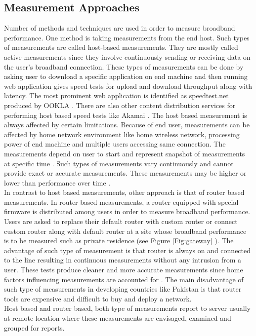 \documentclass{sig-alternate-10pt}
\begin{document}
\subsection {Measurement Approaches}
Number of methods and techniques are used in order to measure broadband performance. One method is taking measurements from the end host. Such types of measurements are called host-based measurements. They are mostly called active measurements since they involve continuously sending or receiving data on the user's broadband connection. These types of measurements can be done by asking user to download a specific application  \cite{08} on end machine and then running web application gives speed tests for upload and download throughput along with latency. The most prominent web application is identified as speedtest.net produced by OOKLA \cite{20}. There are also other content distribution services for performing host based speed tests like Akamai \cite{04}. The host based measurement is always affected by certain limitations. Because of end user, measurements can be affected by home network environment like home wireless network, processing power of end machine and multiple users accessing same connection. The measurements depend on user to start and represent snapshot of measurements at specific time \cite{09}. Such types of measurements vary continuously and cannot provide exact or accurate measurements. These measurements may be higher or lower than performance over time \cite{12}.\\
\indent In contrast to host based measurements, other approach is that of router based measurements. In router based measurements, a router equipped with special firmware is distributed among users in order to measure broadband performance. Users are asked to replace their default router with custom router or connect custom router along with default router at a site whose broadband performance is to be measured such as private residence (see Figure \ref{Fig:gateway} ). The advantage of such type of measurement is that router is always on and connected to the line resulting in continuous measurements without any intrusion from a user. These tests produce cleaner and more accurate measurements since home factors influencing measurements are accounted for \cite{22}. The main disadvantage of such type of measurements in developing countries like Pakistan is that router tools are expensive and difficult to buy and deploy a network.\\
\indent Host based and router based, both type of measurements report to server usually at remote location where these measurements are envisaged, examined and grouped for reports.
\end{document}
